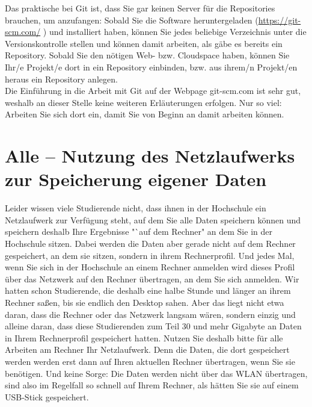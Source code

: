 Das praktische bei Git ist, dass Sie gar keinen Server für die Repositories brauchen, um anzufangen: Sobald Sie die Software heruntergeladen (\url{https://git-scm.com/} ) und installiert haben, können Sie jedes beliebige Verzeichnis unter die Versionskontrolle stellen und können damit arbeiten, als gäbe es bereits ein Repository. Sobald Sie den nötigen Web- bzw. Cloudspace haben, können Sie Ihr/e Projekt/e dort in ein Repository einbinden, bzw. aus ihrem/n Projekt/en heraus ein Repository anlegen.\\

Die Einführung in die Arbeit mit Git auf der Webpage git-scm.com ist sehr gut, weshalb an dieser Stelle keine weiteren Erläuterungen erfolgen. Nur so viel: Arbeiten Sie sich dort ein, damit Sie von Beginn an damit arbeiten können.

\section{Alle – Nutzung des Netzlaufwerks zur Speicherung eigener Daten}

Leider wissen viele Studierende nicht, dass ihnen in der Hochschule ein Netzlaufwerk zur Verfügung steht, auf dem Sie alle Daten speichern können und speichern deshalb Ihre Ergebnisse "`auf dem Rechner" an dem Sie in der Hochschule sitzen. Dabei werden die Daten aber gerade nicht auf dem Rechner gespeichert, an dem sie sitzen, sondern in ihrem Rechnerprofil. Und jedes Mal, wenn Sie sich in der Hochschule an einem Rechner anmelden wird dieses Profil über das Netzwerk auf den Rechner übertragen, an dem Sie sich anmelden. Wir hatten schon Studierende, die deshalb eine halbe Stunde und länger an ihrem Rechner saßen, bis sie endlich den Desktop sahen. Aber das liegt nicht etwa daran, dass die Rechner oder das Netzwerk langsam wären, sondern einzig und alleine daran, dass diese Studierenden zum Teil 30 und mehr Gigabyte an Daten in Ihrem Rechnerprofil gespeichert hatten. Nutzen Sie deshalb bitte für alle Arbeiten am Rechner Ihr Netzlaufwerk. Denn die Daten, die dort gespeichert werden werden erst dann auf Ihren aktuellen Rechner übertragen, wenn Sie sie benötigen. Und keine Sorge: Die Daten werden nicht über das WLAN übertragen, sind also im Regelfall so schnell auf Ihrem Rechner, als hätten Sie sie auf einem USB-Stick gespeichert.\\

